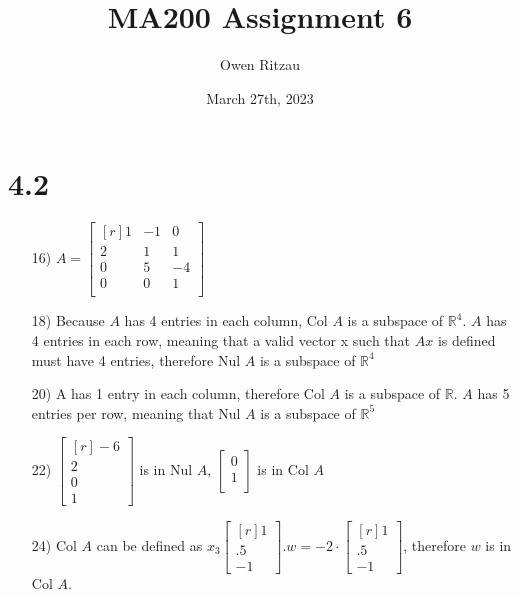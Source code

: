 \documentclass{article}
\title{MA200 Assignment 6}
\author{Owen Ritzau}
\date{March 27th, 2023}
\begin{document}
\maketitle
  \section* {4.2}
  \begin{enumerate}
    \item[16)]
      $A=\begin{bmatrix*}[r]
      1&-1&0\\
      2&1&1\\
      0&5&-4\\
      0&0&1\\
      \end{bmatrix*}$
    
    \item[18)]
      Because $A$ has 4 entries in each column, Col $A$ is a 
      subspace of $\mathbb{R}^4$. $A$ has 4 entries in each row,
      meaning that a valid vector x such that $Ax$ is defined
      must have 4 entries, therefore Nul $A$ is a subspace
      of $\mathbb{R}^4$

    \item[20)]
      A has 1 entry in each column, therefore Col $A$ is a
      subspace of $\mathbb{R}$. $A$ has 5 entries per row, 
      meaning that Nul $A$ is a subspace of $\mathbb{R}^5$

    \item[22)]
      $\begin{bmatrix*}[r]-6\\2\\0\\1\end{bmatrix*}$ is in 
      Nul $A$, 
      $\begin{bmatrix*}0\\1\\\end{bmatrix*}$ is in Col $A$
    
    \item[24)]
      Col $A$ can be defined as $x_3\begin{bmatrix*}[r]
        1\\.5\\-1\end{bmatrix*}. w = -2\cdot\begin{bmatrix*}[r]
        1\\.5\\-1\end{bmatrix*}$, therefore $w$ is in Col $A$.


\end{enumerate}
\end{document}
